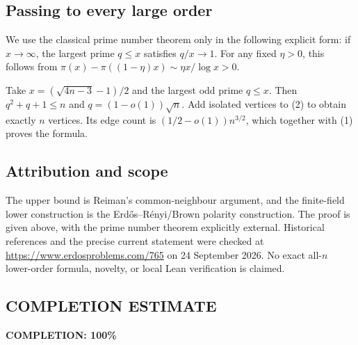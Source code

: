 \subsection*{Passing to every large order}
We use the classical prime number theorem only in the following explicit form: if \(x\to\infty\), the largest prime \(q\leq x\) satisfies \(q/x\to1\). For any fixed \(\eta>0\), this follows from
\(\pi(x)-\pi((1-\eta)x)\sim\eta x/\log x>0\).

Take \(x=(\sqrt{4n-3}-1)/2\) and the largest odd prime \(q\leq x\). Then \(q^2+q+1\leq n\) and \(q=(1-o(1))\sqrt n\). Add isolated vertices to (2) to obtain exactly \(n\) vertices. Its edge count is \((1/2-o(1))n^{3/2}\), which together with (1) proves the formula.

\subsection*{Attribution and scope}
The upper bound is Reiman's common-neighbour argument, and the finite-field lower construction is the Erd\H{o}s--R\'enyi/Brown polarity construction. The proof is given above, with the prime number theorem explicitly external. Historical references and the precise current statement were checked at \url{https://www.erdosproblems.com/765} on 24 September 2026. No exact all-\(n\) lower-order formula, novelty, or local Lean verification is claimed.
\subsection*{COMPLETION ESTIMATE}
\textbf{COMPLETION: 100\%}
